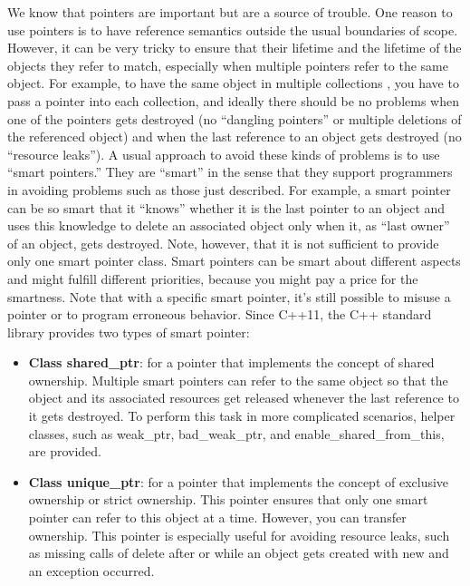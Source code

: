 \documentclass{report}
\begin{document}
\pagebreak 
{}
\bigbreak \noindent 
We know that pointers are important but are a source of trouble. One reason to use pointers is to have reference semantics outside the usual boundaries of scope. However, it can be very tricky to ensure that their lifetime and the lifetime of the objects they refer to match, especially when multiple pointers refer to the same object. For example, to have the same object in multiple collections , you have to pass a pointer into each collection, and ideally there should be no problems when one of the pointers gets destroyed (no “dangling pointers” or multiple deletions of the referenced object) and when the last reference to an object gets destroyed (no “resource leaks”).
\bigbreak \noindent 
A usual approach to avoid these kinds of problems is to use “smart pointers.” They are “smart”
in the sense that they support programmers in avoiding problems such as those just described. For
example, a smart pointer can be so smart that it “knows” whether it is the last pointer to an object
and uses this knowledge to delete an associated object only when it, as “last owner” of an object,
gets destroyed.
\bigbreak \noindent 
Note, however, that it is not sufficient to provide only one smart pointer class. Smart pointers can
be smart about different aspects and might fulfill different priorities, because you might pay a price
for the smartness. Note that with a specific smart pointer, it’s still possible to misuse a pointer or to
program erroneous behavior.
\bigbreak \noindent 
Since C++11, the C++ standard library provides two types of smart pointer:
\begin{itemize}
    \item \textbf{Class shared\_ptr}: for a pointer that implements the concept of shared ownership. Multiple smart pointers can refer to the same object so that the object and its associated resources get released whenever the last reference to it gets destroyed. To perform this task in more complicated scenarios, helper classes, such as weak\_ptr, bad\_weak\_ptr, and enable\_shared\_from\_this, are provided.
    \item \textbf{Class unique\_ptr}: for a pointer that implements the concept of exclusive ownership or strict ownership. This pointer ensures that only one smart pointer can refer to this object at a time. However, you can transfer ownership. This pointer is especially useful for avoiding resource leaks, such as missing calls of delete after or while an object gets created with new and an exception occurred.
\end{itemize}
\end{document}
